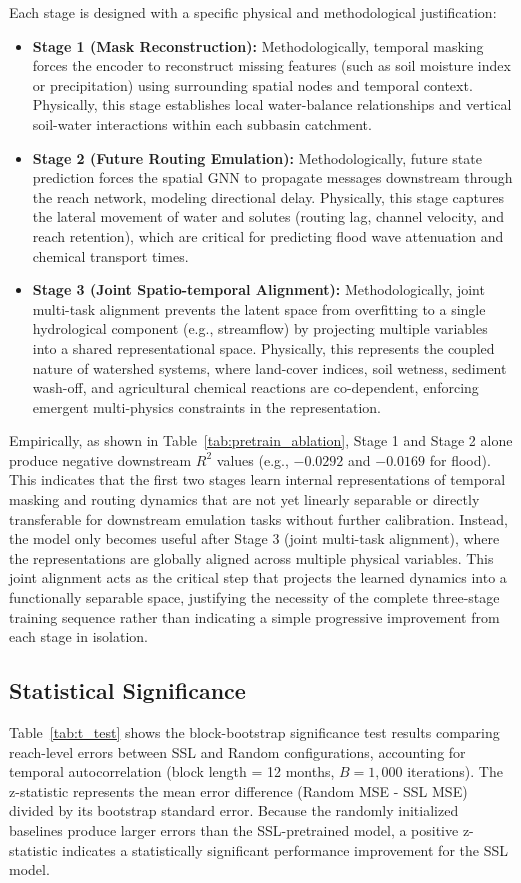 \documentclass[preprint,12pt]{elsarticle}
\begin{document}
Each stage is designed with a specific physical and methodological justification:
\begin{itemize}
    \item \textbf{Stage 1 (Mask Reconstruction):} Methodologically, temporal masking forces the encoder to reconstruct missing features (such as soil moisture index or precipitation) using surrounding spatial nodes and temporal context. Physically, this stage establishes local water-balance relationships and vertical soil-water interactions within each subbasin catchment.
    \item \textbf{Stage 2 (Future Routing Emulation):} Methodologically, future state prediction forces the spatial GNN to propagate messages downstream through the reach network, modeling directional delay. Physically, this stage captures the lateral movement of water and solutes (routing lag, channel velocity, and reach retention), which are critical for predicting flood wave attenuation and chemical transport times.
    \item \textbf{Stage 3 (Joint Spatio-temporal Alignment):} Methodologically, joint multi-task alignment prevents the latent space from overfitting to a single hydrological component (e.g., streamflow) by projecting multiple variables into a shared representational space. Physically, this represents the coupled nature of watershed systems, where land-cover indices, soil wetness, sediment wash-off, and agricultural chemical reactions are co-dependent, enforcing emergent multi-physics constraints in the representation.
\end{itemize}

Empirically, as shown in Table~\ref{tab:pretrain_ablation}, Stage 1 and Stage 2 alone produce negative downstream $R^2$ values (e.g., $-0.0292$ and $-0.0169$ for flood). This indicates that the first two stages learn internal representations of temporal masking and routing dynamics that are not yet linearly separable or directly transferable for downstream emulation tasks without further calibration. Instead, the model only becomes useful after Stage 3 (joint multi-task alignment), where the representations are globally aligned across multiple physical variables. This joint alignment acts as the critical step that projects the learned dynamics into a functionally separable space, justifying the necessity of the complete three-stage training sequence rather than indicating a simple progressive improvement from each stage in isolation.

\subsection{Statistical Significance}
Table~\ref{tab:t_test} shows the block-bootstrap significance test results comparing reach-level errors between SSL and Random configurations, accounting for temporal autocorrelation (block length = 12 months, $B=1{,}000$ iterations). The z-statistic represents the mean error difference (Random MSE - SSL MSE) divided by its bootstrap standard error. Because the randomly initialized baselines produce larger errors than the SSL-pretrained model, a positive z-statistic indicates a statistically significant performance improvement for the SSL model.
\end{document}
